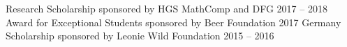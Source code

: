 \begin{cvhonors}
  \cvhonor
    {Research Scholarship}
    {sponsored by HGS MathComp and DFG}
    {}
    {2017 -- 2018}
  \cvhonor
    {Award for Exceptional Students}
    {sponsored by Beer Foundation}
    {}
    {2017}
  \cvhonor
    {Germany Scholarship}
    {sponsored by Leonie Wild Foundation}
    {}
    {2015 -- 2016}
\end{cvhonors}
